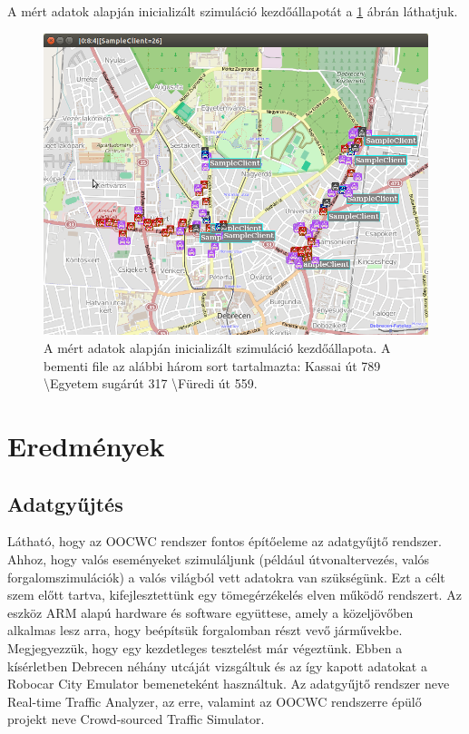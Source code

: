 \documentclass[a4paper,12pt]{report}
\begin{document}


A mért adatok alapján inicializált szimuláció kezdőállapotát a \ref{simulinit} ábrán láthatjuk. 

\begin{figure}[h]
\centerline{
\includegraphics[width=6in]{img/ut3}}
\caption{A mért adatok alapján inicializált szimuláció kezdőállapota. A bementi file az alábbi három sort tartalmazta: Kassai \'ut 789 \textbackslash  Egyetem sug\'ar\'ut 317  \textbackslash  F\"uredi \'ut 559.}
\label{simulinit}
\end{figure}

\chapter{Eredmények}
\label{results}

\section{Adatgyűjtés}

Látható, hogy az OOCWC rendszer fontos építőeleme az adatgyűjtő rendszer. Ahhoz, hogy valós eseményeket szimuláljunk (például útvonaltervezés, valós forgalomszimulációk) a valós világból vett adatokra van szükségünk. Ezt a célt szem előtt tartva, kifejlesztettünk egy tömegérzékelés elven működő rendszert. Az eszköz ARM alapú hardware és software együttese, amely a közeljövőben alkalmas lesz arra, hogy beépítsük forgalomban részt vevő járművekbe. Megjegyezzük, hogy egy kezdetleges tesztelést már végeztünk. Ebben a kísérletben Debrecen néhány utcáját vizsgáltuk és az így kapott adatokat a Robocar City Emulator bemeneteként használtuk. Az adatgyűjtő rendszer neve Real-time Traffic Analyzer, az erre, valamint az OOCWC rendszerre épülő projekt neve Crowd-sourced Traffic Simulator.
\end{document}
